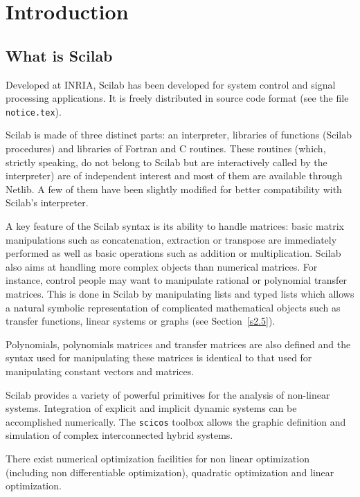 
\chapter{Introduction}

\section{What is Scilab}

Developed at INRIA, Scilab has been developed for system control and
signal processing applications. It 
is freely distributed in source code format (see the file {\tt notice.tex}). 

Scilab is made of three distinct parts: an interpreter, 
libraries of functions (Scilab procedures) and libraries of Fortran 
and C routines. 
These routines (which, strictly speaking, do not belong to Scilab but
are interactively called by the interpreter) are of 
independent interest and most of them are available through Netlib. 
A few of them have been slightly modified for better compatibility
with Scilab's interpreter.
 
A key feature of the Scilab syntax is its ability to handle matrices: 
basic matrix manipulations such as concatenation, 
extraction or transpose are immediately performed as well as basic operations
such as addition or multiplication. Scilab also aims at handling more complex
objects than numerical matrices. For instance, control people may want
to manipulate rational or polynomial transfer matrices. This is
done in Scilab by manipulating lists and typed lists which allows a 
natural symbolic representation of complicated
mathematical objects such as transfer functions, linear systems or graphs
(see Section~\ref{s2.5}).

        Polynomials, polynomials matrices and transfer matrices 
are also defined and the syntax used for manipulating these matrices
is identical to that used for manipulating constant vectors and matrices.

        Scilab provides a variety of powerful primitives for
the analysis of non-linear systems.  
Integration of explicit and implicit dynamic systems can be accomplished 
numerically.  The {\tt scicos} toolbox allows the graphic definition
and simulation of complex interconnected hybrid systems.

 There exist numerical optimization 
facilities for non linear optimization (including
non differentiable optimization), quadratic optimization and 
linear optimization.

